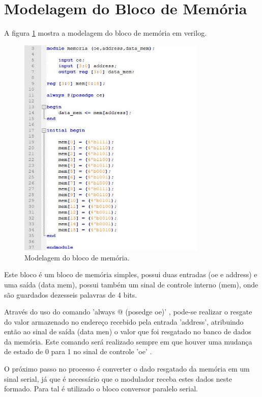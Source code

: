 \section{Modelagem do Bloco de Memória}

A figura \ref{verilogmem} mostra a modelagem do bloco de memória em verilog.

\begin{figure}[ht!]
  \centering
  \includegraphics[width=0.8\textwidth]{figuras/verilogmem.JPG}
  \caption{Modelagem do bloco de memória.}
  \label{verilogmem}
\end{figure}

Este bloco é um bloco de memória simples, possui duas entradas (oe e address) e uma saída (data mem), possui também um sinal de controle interno (mem), onde são guardados dezesseis palavras de 4 bits.

Através do uso do comando 'always @ (posedge oe)' , pode-se realizar o resgate do valor armazenado no endereço recebido pela entrada 'address', atribuindo então ao sinal de saída (data men) o valor que foi resgatado no banco de dados da memória. Este comando será realizado sempre em que houver uma mudança de estado de 0 para 1 no sinal de controle 'oe' . 

O próximo passo no processo é converter o dado resgatado da memória em um sinal serial, já que é necessário que o modulador receba estes dados neste formado. Para tal é utilizado o bloco conversor paralelo serial.

